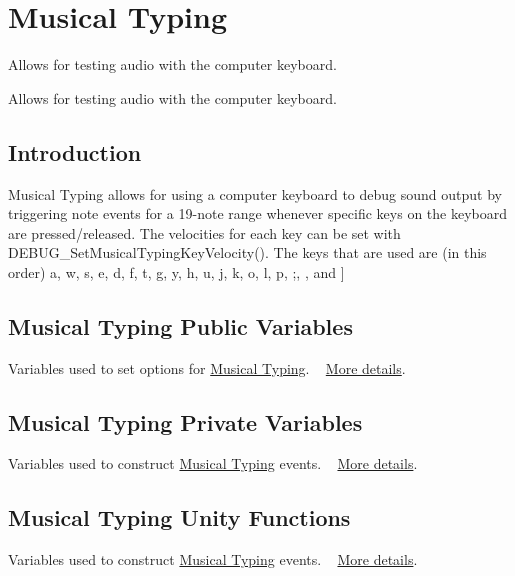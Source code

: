 \hypertarget{group___musical_typing}{}\section{Musical Typing}
\label{group___musical_typing}


Allows for testing audio with the computer keyboard.  


Allows for testing audio with the computer keyboard. 

\hypertarget{group___musical_typing_intro}{}\subsection{Introduction}\label{group___musical_typing_intro}
Musical Typing allows for using a computer keyboard to debug sound output by triggering note events for a 19-\/note range whenever specific keys on the keyboard are pressed/released. The velocities for each key can be set with D\+E\+B\+U\+G\+\_\+\+Set\+Musical\+Typing\+Key\+Velocity(). The keys that are used are (in this order) a, w, s, e, d, f, t, g, y, h, u, j, k, o, l, p, ;, \textquotesingle{}, and \mbox{]}

\begin{DoxyParagraph}{}

\end{DoxyParagraph}
\hypertarget{group___musical_typing_musvar}{}\subsection{Musical Typing Public Variables}\label{group___musical_typing_musvar}
Variables used to set options for \hyperlink{}{Musical Typing}. ~\newline
 \hyperlink{group___mus_typ_pub_var}{More details}.

\begin{DoxyParagraph}{}

\end{DoxyParagraph}
\hypertarget{group___musical_typing_musprivvar}{}\subsection{Musical Typing Private Variables}\label{group___musical_typing_musprivvar}
Variables used to construct \hyperlink{}{Musical Typing} events. ~\newline
 \hyperlink{group___mus_typ_priv_var}{More details}.

\begin{DoxyParagraph}{}

\end{DoxyParagraph}
\hypertarget{group___musical_typing_mustypunit}{}\subsection{Musical Typing Unity Functions}\label{group___musical_typing_mustypunit}
Variables used to construct \hyperlink{}{Musical Typing} events. ~\newline
 \hyperlink{group___mus_typ_unity}{More details}.

